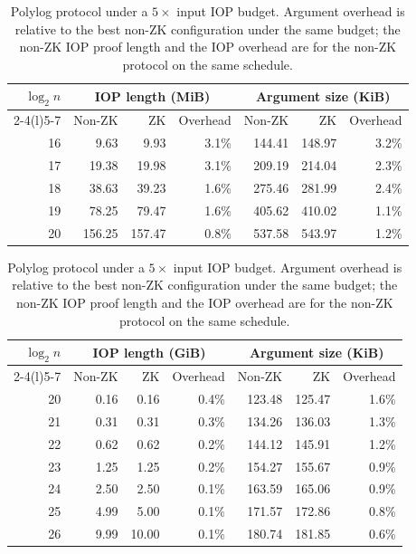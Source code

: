 \begin{table}[p]
\centering
\small
\setlength{\tabcolsep}{7pt}
\renewcommand{\arraystretch}{1.05}
\begin{tabular}{@{}rrrrrrr@{}}
\toprule
$\log_2 n$ & \multicolumn{3}{c}{IOP length (MiB)} & \multicolumn{3}{c}{Argument size (KiB)} \\
\cmidrule(lr){2-4}\cmidrule(l){5-7}
 & Non-ZK & ZK & Overhead & Non-ZK & ZK & Overhead \\
\midrule
16 & 9.63 & 9.93 & 3.1\% & 144.41 & 148.97 & 3.2\% \\
17 & 19.38 & 19.98 & 3.1\% & 209.19 & 214.04 & 2.3\% \\
18 & 38.63 & 39.23 & 1.6\% & 275.46 & 281.99 & 2.4\% \\
19 & 78.25 & 79.47 & 1.6\% & 405.62 & 410.02 & 1.1\% \\
20 & 156.25 & 157.47 & 0.8\% & 537.58 & 543.97 & 1.2\% \\
\bottomrule
\end{tabular}
\caption{Sublinear protocol under a $5\times$ input IOP budget. Argument overhead is relative to the best non-ZK configuration under the same budget; the non-ZK IOP proof length and the IOP overhead are for the non-ZK protocol on the same schedule.}
\label{tab:implementation-sublinear}
\par\medskip
\centering
\small
\setlength{\tabcolsep}{7pt}
\renewcommand{\arraystretch}{1.05}
\begin{tabular}{@{}rrrrrrr@{}}
\toprule
$\log_2 n$ & \multicolumn{3}{c}{IOP length (GiB)} & \multicolumn{3}{c}{Argument size (KiB)} \\
\cmidrule(lr){2-4}\cmidrule(l){5-7}
 & Non-ZK & ZK & Overhead & Non-ZK & ZK & Overhead \\
\midrule
20 & 0.16 & 0.16 & 0.4\% & 123.48 & 125.47 & 1.6\% \\
21 & 0.31 & 0.31 & 0.3\% & 134.26 & 136.03 & 1.3\% \\
22 & 0.62 & 0.62 & 0.2\% & 144.12 & 145.91 & 1.2\% \\
23 & 1.25 & 1.25 & 0.2\% & 154.27 & 155.67 & 0.9\% \\
24 & 2.50 & 2.50 & 0.1\% & 163.59 & 165.06 & 0.9\% \\
25 & 4.99 & 5.00 & 0.1\% & 171.57 & 172.86 & 0.8\% \\
26 & 9.99 & 10.00 & 0.1\% & 180.74 & 181.85 & 0.6\% \\
\bottomrule
\end{tabular}
\caption{Polylog protocol under a $5\times$ input IOP budget. Argument overhead is relative to the best non-ZK configuration under the same budget; the non-ZK IOP proof length and the IOP overhead are for the non-ZK protocol on the same schedule.}
\label{tab:implementation-polylog}
\end{table}
